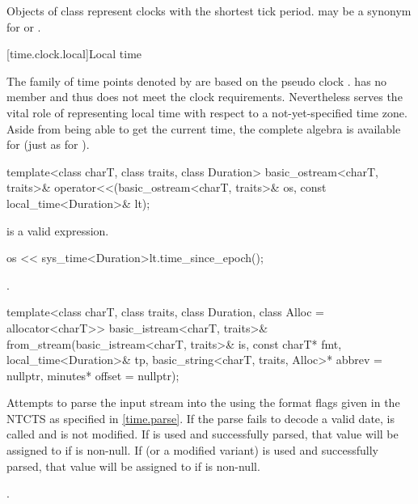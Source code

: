 \pnum
Objects of class  represent clocks with the
shortest tick period.  may be a synonym for
 or .

[time.clock.local]{Local time}
%

\pnum
The family of time points
denoted by 
are based on the pseudo clock .
 has no member 
and thus does not meet the clock requirements.
Nevertheless  serves the vital role of
representing local time with respect to a not-yet-specified time zone.
Aside from being able to get the current time,
the complete  algebra is available
for  (just as for ).

%
\begin{itemdecl}
template<class charT, class traits, class Duration>
  basic_ostream<charT, traits>&
    operator<<(basic_ostream<charT, traits>& os, const local_time<Duration>& lt);
\end{itemdecl}

\begin{itemdescr}
\pnum
\constraints
{} is a valid expression.

\pnum
\effects
\begin{codeblock}
os << sys_time<Duration>{lt.time_since_epoch()};
\end{codeblock}

\pnum
\returns
{}.
\end{itemdescr}

%
\begin{itemdecl}
template<class charT, class traits, class Duration, class Alloc = allocator<charT>>
  basic_istream<charT, traits>&
    from_stream(basic_istream<charT, traits>& is, const charT* fmt,
                local_time<Duration>& tp, basic_string<charT, traits, Alloc>* abbrev = nullptr,
                minutes* offset = nullptr);
\end{itemdecl}

\begin{itemdescr}
\pnum
\effects
Attempts to parse the input stream 
into the   using
the format flags given in the NTCTS 
as specified in \ref{time.parse}.
If the parse fails to decode a valid date,
 is called and
 is not modified.
If  is used and successfully parsed,
that value will be assigned to  if  is non-null.
If  (or a modified variant) is used and successfully parsed,
that value will be assigned to  if  is non-null.

\pnum
\returns
{}.
\end{itemdescr}

